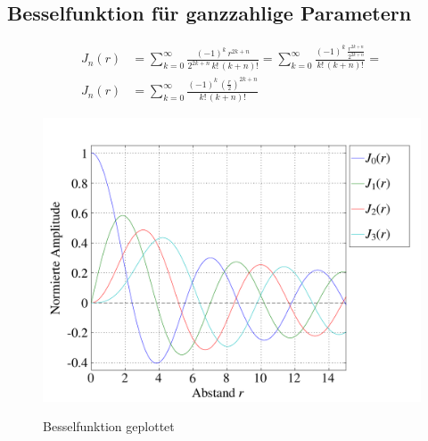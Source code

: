 \subsection{Besselfunktion f\"ur ganzzahlige Parametern}
\begin{align}
	J_n \left( r \right)
	&= \nonumber
	\sum_{k=0} ^{\infty}
	\frac
	{
		\left( - 1 \right) ^k \, r ^{2k+n}
	}{
		2^{2k+n} \, {k}! \, { \left( k + n \right) }!
	}
	=
	\sum_{k=0} ^{\infty}
	\frac
	{
		\left( - 1 \right) ^k \, 
		\frac
		{
			r ^{2k+n}
		}{
			2^{2k+n}
		}
	}{
		{k}! \, { \left( k + n \right) }!
	} 
	=
	\\
	J_n \left( r \right)
	&=
	\sum_{k=0} ^{\infty}
	\frac
	{
		\left( - 1 \right) ^k \, 
		\left(		
		\frac
		{
			r
		}{
			2
		} \right) ^{2k+n}
	}{
		{k}! \, { \left( k + n \right) }!
	}
	\label{eq:bessel_summenformel}
\end{align}



\begin{figure}
	\begin{center}
		\includegraphics[scale=0.5]{kreis/besselfunction.pdf}
		\label{img:besselfunction}
		\caption[Besselfunktion]{Besselfunktion geplottet}
	\end{center}
\end{figure}

%
